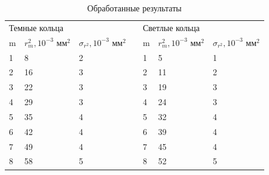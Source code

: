 \documentclass[a4paper,12pt]{article}
\theoremstyle{plain} %
\theoremstyle{definition} %
\theoremstyle{remark} %
\begin{document}
\begin{table}[h!]
	\centering
	\caption{Обработанные результаты}
	\label{table:pre_res}
	\begin{tabular}{lllllll}
		\multicolumn{3}{l}{Темные кольца} &  & \multicolumn{3}{l}{Светлые кольца} \\ \cline{1-3} \cline{5-7} 
		\multicolumn{1}{|l|}{m} & \multicolumn{1}{l|}{$r^2_m, 10^{-3}$ мм$^2$} & \multicolumn{1}{l|}{$\sigma_{r^2}, 10^{-3}$ мм$^2$} & \multicolumn{1}{l|}{} & \multicolumn{1}{l|}{m} & \multicolumn{1}{l|}{$r^2_m, 10^{-3}$ мм$^2$} & \multicolumn{1}{l|}{$\sigma_{r^2}, 10^{-3}$ мм$^2$} \\ \cline{1-3} \cline{5-7} 
		\multicolumn{1}{|l|}{1} & \multicolumn{1}{l|}{8} & \multicolumn{1}{l|}{2} & \multicolumn{1}{l|}{} & \multicolumn{1}{l|}{1} & \multicolumn{1}{l|}{5} & \multicolumn{1}{l|}{1} \\ \cline{1-3} \cline{5-7} 
		\multicolumn{1}{|l|}{2} & \multicolumn{1}{l|}{16} & \multicolumn{1}{l|}{3} & \multicolumn{1}{l|}{} & \multicolumn{1}{l|}{2} & \multicolumn{1}{l|}{11} & \multicolumn{1}{l|}{2} \\ \cline{1-3} \cline{5-7} 
		\multicolumn{1}{|l|}{3} & \multicolumn{1}{l|}{22} & \multicolumn{1}{l|}{3} & \multicolumn{1}{l|}{} & \multicolumn{1}{l|}{3} & \multicolumn{1}{l|}{19} & \multicolumn{1}{l|}{3} \\ \cline{1-3} \cline{5-7} 
		\multicolumn{1}{|l|}{4} & \multicolumn{1}{l|}{29} & \multicolumn{1}{l|}{3} & \multicolumn{1}{l|}{} & \multicolumn{1}{l|}{4} & \multicolumn{1}{l|}{24} & \multicolumn{1}{l|}{3} \\ \cline{1-3} \cline{5-7} 
		\multicolumn{1}{|l|}{5} & \multicolumn{1}{l|}{35} & \multicolumn{1}{l|}{4} & \multicolumn{1}{l|}{} & \multicolumn{1}{l|}{5} & \multicolumn{1}{l|}{32} & \multicolumn{1}{l|}{4} \\ \cline{1-3} \cline{5-7} 
		\multicolumn{1}{|l|}{6} & \multicolumn{1}{l|}{42} & \multicolumn{1}{l|}{4} & \multicolumn{1}{l|}{} & \multicolumn{1}{l|}{6} & \multicolumn{1}{l|}{39} & \multicolumn{1}{l|}{4} \\ \cline{1-3} \cline{5-7} 
		\multicolumn{1}{|l|}{7} & \multicolumn{1}{l|}{49} & \multicolumn{1}{l|}{4} & \multicolumn{1}{l|}{} & \multicolumn{1}{l|}{7} & \multicolumn{1}{l|}{45} & \multicolumn{1}{l|}{4} \\ \cline{1-3} \cline{5-7} 
		\multicolumn{1}{|l|}{8} & \multicolumn{1}{l|}{58} & \multicolumn{1}{l|}{5} & \multicolumn{1}{l|}{} & \multicolumn{1}{l|}{8} & \multicolumn{1}{l|}{52} & \multicolumn{1}{l|}{5} \\ \cline{1-3} \cline{5-7} 
	\end{tabular}
\end{table}
\end{document}
